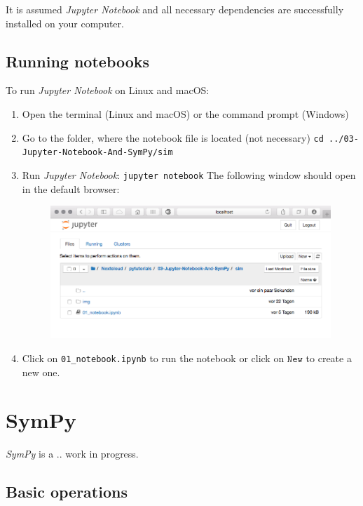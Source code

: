 \documentclass[a4paper,11pt,headings=standardclasses,parskip=half]{scrartcl}
\newcommand{\jp}{\emph{Jupyter Notebook}\xspace}
\newcommand{\sympy}{\emph{SymPy}\xspace}
\begin{document}
It is assumed \jp and all necessary dependencies are successfully installed on your computer.
\subsection{Running notebooks}
To run \jp on Linux and macOS:
\begin{enumerate}
\item Open the terminal (Linux and macOS) or the command prompt (Windows)
\item Go to the folder, where the notebook file is located (not necessary)
	\subitem \texttt{cd ../03-Jupyter-Notebook-And-SymPy/sim}
\item Run \jp: 
	\subitem \texttt{jupyter notebook}
	\subitem The following window should open in the default browser:
\begin{figure}[htb]
\centering
\includegraphics[scale=0.4]{img/jupyter_screenshot}
\end{figure}
\item Click on \texttt{01\_notebook.ipynb} to run the notebook or click on $\texttt{New}$ to create a new one.
\end{enumerate}  
\newpage
\section{SymPy}
\sympy is a .. work in progress.
\subsection{Basic operations}
\end{document}
